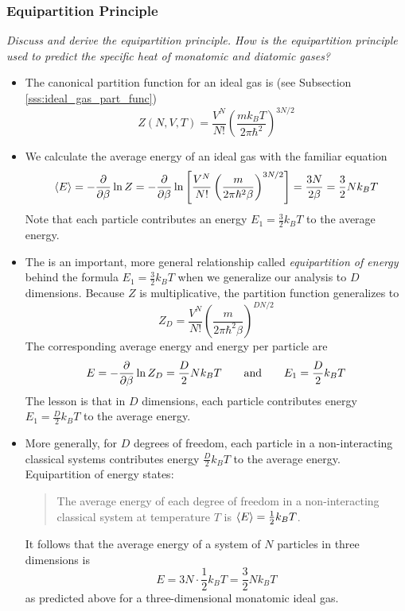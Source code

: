 \documentclass[11pt, a4paper]{article}
\begin{document}
\subsubsection{Equipartition Principle}
\textit{Discuss and derive the equipartition principle. How is the equipartition principle used to predict the specific heat of monatomic and diatomic gases?}

\begin{itemize}

	\item The canonical partition function for an ideal gas is (see Subsection \ref{sss:ideal_gas_part_func}) 
	\begin{equation*}
		Z(N, V, T) = \frac{V^{N}}{N!} \left(\frac{mk_{B}T}{2\pi \hbar^{2}}\right)^{3N/2}
	\end{equation*}
	
	\item We calculate the average energy of an ideal gas with the familiar equation
	\begin{equation*}
		\expval{E} = - \pdv{}{\beta} \ln Z = - \pdv{}{\beta}  \ln\left [\frac{V^{N}}{N!} \left(\frac{m}{2\pi \hbar^{2} \beta}\right)^{3N/2}\right ] = \frac{3N}{2\beta} = \frac{3}{2}Nk_{B}T
	\end{equation*}
	Note that each particle contributes an energy $ E_{1} = \frac{3}{2}k_{B}T $ to the average energy.
	
	\item The is an important, more general relationship called \textit{equipartition of energy} behind the formula $ E_{1} = \frac{3}{2}k_{B}T $ when we generalize our analysis to $ D $ dimensions. Because $ Z $ is multiplicative, the partition function generalizes to
	\begin{equation*}
		Z_{D} = \frac{V^{N}}{N!} \left(\frac{m}{2\pi \hbar^{2} \beta}\right)^{DN/2}
	\end{equation*}
	The corresponding average energy and energy per particle are
	\begin{equation*}
		E = - \pdv{}{\beta} \ln Z_{D} = \frac{D}{2}Nk_{B}T \qquad \text{and} \qquad E_{1} = \frac{D}{2}k_{B}T
	\end{equation*}
	The lesson is that in $ D $ dimensions, each particle contributes energy $ E_{1} = \frac{D}{2}k_{B}T $ to the average energy.
	
	\item More generally, for $ D $ degrees of freedom, each particle in a non-interacting classical systems contributes energy $ \frac{D}{2}k_{B}T $ to the average energy. Equipartition of energy states:
	\begin{quote}
		The average energy of each degree of freedom in a non-interacting classical system at temperature $ T $ is $ \expval{E} = \frac{1}{2} k_{B}T $.
	\end{quote}
	It follows that the average energy of a system of $ N $ particles in three dimensions is 
	\begin{equation*}
		E = 3N \cdot \frac{1}{2} k_{B}T = \frac{3}{2}Nk_{B}T
	\end{equation*}
	as predicted above for a three-dimensional monatomic ideal gas.
	

\end{itemize}
\end{document}
